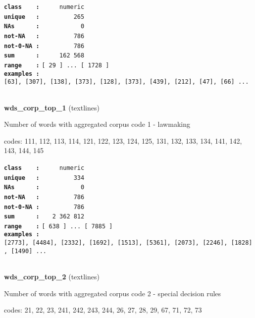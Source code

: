 \documentclass[]{article}
\begin{document}
\textbf{\texttt{class\ \ \ \ :}} \texttt{~~~~~numeric}\\
\textbf{\texttt{unique\ \ \ :}} \texttt{~~~~~~~~~265}\\
\textbf{\texttt{NAs\ \ \ \ \ \ :}} \texttt{~~~~~~~~~~~0}\\
\textbf{\texttt{not-NA\ \ \ :}} \texttt{~~~~~~~~~786}\\
\textbf{\texttt{not-0-NA\ :}} \texttt{~~~~~~~~~786}\\
\textbf{\texttt{sum\ \ \ \ \ \ :}} \texttt{~~~~~162~568}\\
\textbf{\texttt{range\ \ \ \ :}}
\texttt{{[}\ 29\ {]}\ ...\ {[}\ 1728\ {]}}\\
\textbf{\texttt{examples\ :}}
\texttt{{[}63{]},\ {[}307{]},\ {[}138{]},\ {[}373{]},\ {[}128{]},\ {[}373{]},\ {[}439{]},\ {[}212{]},\ {[}47{]},\ {[}66{]}\ ...}\\

~

\textbf{wds\_corp\_top\_1} (textlines)

Number of words with aggregated corpus code 1 - lawmaking

codes: 111, 112, 113, 114, 121, 122, 123, 124, 125, 131, 132, 133, 134,
141, 142, 143, 144, 145

\textbf{\texttt{class\ \ \ \ :}} \texttt{~~~~~numeric}\\
\textbf{\texttt{unique\ \ \ :}} \texttt{~~~~~~~~~334}\\
\textbf{\texttt{NAs\ \ \ \ \ \ :}} \texttt{~~~~~~~~~~~0}\\
\textbf{\texttt{not-NA\ \ \ :}} \texttt{~~~~~~~~~786}\\
\textbf{\texttt{not-0-NA\ :}} \texttt{~~~~~~~~~786}\\
\textbf{\texttt{sum\ \ \ \ \ \ :}} \texttt{~~~2~362~812}\\
\textbf{\texttt{range\ \ \ \ :}}
\texttt{{[}\ 638\ {]}\ ...\ {[}\ 7885\ {]}}\\
\textbf{\texttt{examples\ :}}
\texttt{{[}2773{]},\ {[}4484{]},\ {[}2332{]},\ {[}1692{]},\ {[}1513{]},\ {[}5361{]},\ {[}2073{]},\ {[}2246{]},\ {[}1828{]},\ {[}1490{]}\ ...}\\

~

\textbf{wds\_corp\_top\_2} (textlines)

Number of words with aggregated corpus code 2 - special decision rules

codes: 21, 22, 23, 241, 242, 243, 244, 26, 27, 28, 29, 67, 71, 72, 73
\end{document}
